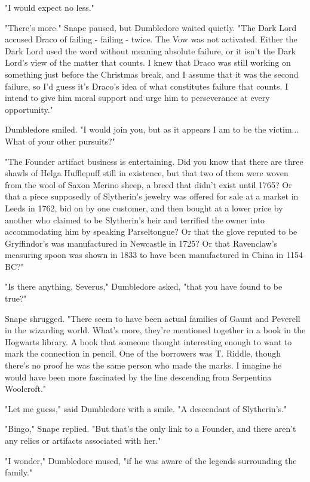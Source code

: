 \documentclass[a4paper,11pt]{article}
\begin{document}
"I would expect no less."

"There's more." Snape paused, but Dumbledore waited quietly. "The Dark Lord accused Draco of failing - failing - twice. The Vow was not activated. Either the Dark Lord used the word without meaning absolute failure, or it isn't the Dark Lord's view of the matter that counts. I knew that Draco was still working on something just before the Christmas break, and I assume that it was the second failure, so I'd guess it's Draco's idea of what constitutes failure that counts. I intend to give him moral support and urge him to perseverance at every opportunity."

Dumbledore smiled. "I would join you, but as it appears I am to be the victim... What of your other pursuits?"

"The Founder artifact business is entertaining. Did you know that there are three shawls of Helga Hufflepuff still in existence, but that two of them were woven from the wool of Saxon Merino sheep, a breed that didn't exist until 1765? Or that a piece supposedly of Slytherin's jewelry was offered for sale at a market in Leeds in 1762, bid on by one customer, and then bought at a lower price by another who claimed to be Slytherin's heir and terrified the owner into accommodating him by speaking Parseltongue? Or that the glove reputed to be Gryffindor's was manufactured in Newcastle in 1725? Or that Ravenclaw's measuring spoon was shown in 1833 to have been manufactured in China in 1154 BC?"

"Is there anything, Severus," Dumbledore asked, "that you have found to be true?"

Snape shrugged. "There seem to have been actual families of Gaunt and Peverell in the wizarding world. What's more, they're mentioned together in a book in the Hogwarts library. A book that someone thought interesting enough to want to mark the connection in pencil. One of the borrowers was T. Riddle, though there's no proof he was the same person who made the marks. I imagine he would have been more fascinated by the line descending from Serpentina Woolcroft."

"Let me guess," said Dumbledore with a smile. "A descendant of Slytherin's."

"Bingo," Snape replied. "But that's the only link to a Founder, and there aren't any relics or artifacts associated with her."

"I wonder," Dumbledore mused, "if he was aware of the legends surrounding the family."
\end{document}
